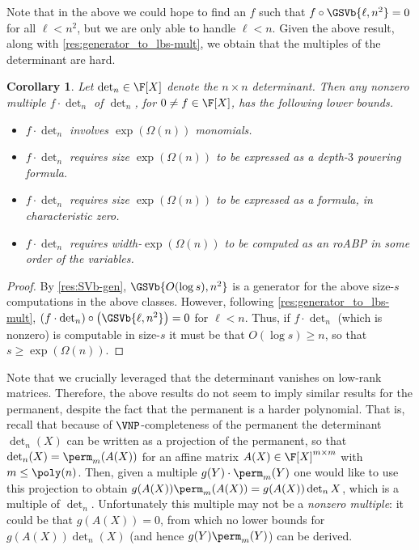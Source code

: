 \documentclass[11pt]{article}
\numberwithin{equation}{section}
\newtheorem{corollary}[theorem]{Corollary}
\theoremstyle{definition}
\theoremstyle{plain}
\begin{document}
Note that in the above we could hope to find an $f$ such that $f\circ \GSVb{\ell,n^2}=0$ for all $\ell<n^2$, but we are only able to handle $\ell<n$. Given the above result, along with \autoref{res:generator_to_lbs-mult}, we obtain that the multiples of the determinant are hard.

\begin{corollary}\label{res:lbs-mult:pit:det}
        Let $\det_n\in\F[X]$ denote the $n\times n$ determinant.  Then any nonzero multiple $f\cdot \det_n$ of $\det_n$, for $0 \ne f\in\F[X]$, has the following lower bounds.
        \begin{itemize}
                \item $f\cdot \det_n$ involves $\exp(\Omega(n))$ monomials.
                \item $f\cdot \det_n$ requires size $\exp(\Omega(n))$ to be expressed as a depth-$3$ powering formula.
                \item $f\cdot \det_n$ requires size $\exp(\Omega(n))$ to be expressed as a \sumpowc formula, in characteristic zero.
                \item $f\cdot \det_n$ requires width-$\exp(\Omega(n))$ to be computed as an roABP in some order of the variables.
        \end{itemize}
\end{corollary}
\begin{proof}
        By \autoref{res:SVb-gen}, $\GSVb{O(\log s),n^2}$ is a generator for the above size-$s$ computations in the above classes.  However, following \autoref{res:generator_to_lbs-mult}, $(f\cdot\det_n)\circ \left(\GSVb{\ell,n^2}\right)=0$ for $\ell<n$.  Thus, if $f\cdot \det_n$ (which is nonzero) is computable in size-$s$ it must be that $O(\log s)\ge n$, so that $s\ge\exp(\Omega(n))$.
\end{proof}

Note that we crucially leveraged that the determinant vanishes on low-rank matrices.  Therefore, %
the above results do not seem to imply similar results for the permanent, despite the fact that the permanent is a harder polynomial. That is, recall that because of $\VNP$-completeness of the permanent the determinant $\det_n(X)$ can be written as a projection of the permanent, so that $\det_n(X)=\perm_m(A(X))$ for an affine matrix $A(X)\in\F[X]^{m\times m}$ with $m\le \poly(n)$.  Then, given a multiple $g(Y)\cdot\perm_m(Y)$ one would like to use this projection to obtain $g(A(X))\perm_m( A(X))=g(A(X))\det_n X$, which is a multiple of $\det_n$.  Unfortunately this multiple may not be a \emph{nonzero multiple}: it could be that $g(A(X))=0$, from which no lower bounds for $g(A(X))\det_n(X)$ (and hence $g(Y)\perm_m (Y)$) can be derived.
\end{document}
